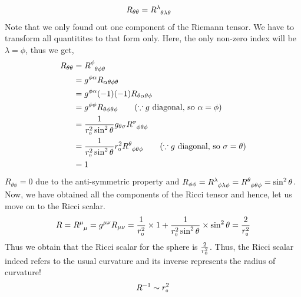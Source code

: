\begin{align*}
    R_{\theta\theta} & = \rie{\lambda}{\theta}{\lambda}{\theta}
\end{align*}
Note that we only found out one component of the Riemann tensor. We have to transform all quantitites to that form only. Here, the only non-zero index will be $\lambda=\phi$, thus we get,
\begin{align*}
    R_{\theta\theta} &= \rie{\phi}{\theta}{\phi}{\theta}\\
    &=g^{\phi\alpha}R_{\alpha \theta \phi \theta}\\
    &=g^{\phi\alpha} (-1)(-1)R_{\theta \alpha \theta \phi }\\
    &=g^{\phi\phi} R_{\theta \phi \theta \phi } \qquad \text{($\because g$ diagonal, so $\alpha = \phi$)}\\
    &=\frac{1}{r\tund{0}^2\sin^2\theta} g_{\theta\sigma}\rie{\sigma}{\phi}{\theta}{\phi }\\
    &=\frac{1}{r\tund{0}^2\sin^2\theta} r\tund{0}^2\rie{\theta}{\phi}{\theta}{\phi }\qquad \text{($\because g$ diagonal, so $\sigma = \theta$)}\\
    &=1
\end{align*}
$R_{\theta\phi} = 0$ due to the anti-symmetric property and $R_{\phi\phi} = \rie{\lambda}{\phi}{\lambda}{\phi} =\rie{\theta}{\phi}{\theta}{\phi} =\sin^2\theta$. Now, we have obtained all the components of the Ricci tensor and hence, let us move on to the Ricci scalar. 
\begin{align*}
    R = \tensor{R}{^\mu _\mu} = g^{\mu\nu}R_{\mu\nu} = \frac{1}{r\tund{0}^2}\times 1 + \frac{1}{r\tund{0}^2\sin^2\theta}\times \sin^2\theta = \frac{2}{r\tund{0}^2}
\end{align*}
Thus we obtain that the Ricci scalar for the sphere is $\frac{2}{r_{\text{\tiny 0}}^2}$. Thus, the Ricci scalar indeed refers to the usual curvature and its inverse represents the radius of curvature!
$$R^{-1}\sim r_{\text{\tiny 0}}^2$$